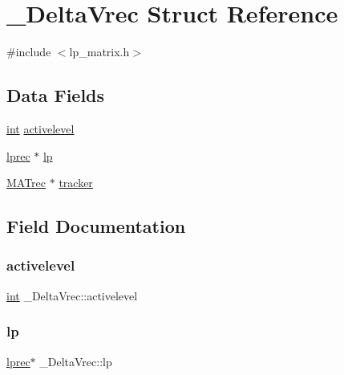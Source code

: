 \hypertarget{struct___delta_vrec}{}\section{\+\_\+\+Delta\+Vrec Struct Reference}
\label{struct___delta_vrec}


{\ttfamily \#include $<$lp\+\_\+matrix.\+h$>$}

\subsection*{Data Fields}
\begin{DoxyCompactItemize}
\item 
\hyperlink{lp__lib_8h_adeb9ec6400320e4923ac9d836d509ddb}{int} \hyperlink{struct___delta_vrec_abe8046f6a32a289536b72e71cbb0e541}{activelevel}
\item 
\hyperlink{lp__types_8h_afe42f1373b9ee8d824b5cad6a22d24c6}{lprec} $\ast$ \hyperlink{struct___delta_vrec_a98176dfc8a84a06afe81fdd1ee0c24c3}{lp}
\item 
\hyperlink{lp__matrix_8h_a5e7313f2f5107ac1c98af642b9739620}{M\+A\+Trec} $\ast$ \hyperlink{struct___delta_vrec_a748b0643c039afbba7690eaa7981cce1}{tracker}
\end{DoxyCompactItemize}


\subsection{Field Documentation}
\mbox{\label{struct___delta_vrec_abe8046f6a32a289536b72e71cbb0e541}} 
\subsubsection{\texorpdfstring{activelevel}{activelevel}}
{\footnotesize\ttfamily \hyperlink{lp__lib_8h_adeb9ec6400320e4923ac9d836d509ddb}{int} \+\_\+\+Delta\+Vrec\+::activelevel}

\mbox{\label{struct___delta_vrec_a98176dfc8a84a06afe81fdd1ee0c24c3}} 
\subsubsection{\texorpdfstring{lp}{lp}}
{\footnotesize\ttfamily \hyperlink{lp__types_8h_afe42f1373b9ee8d824b5cad6a22d24c6}{lprec}$\ast$ \+\_\+\+Delta\+Vrec\+::lp}

